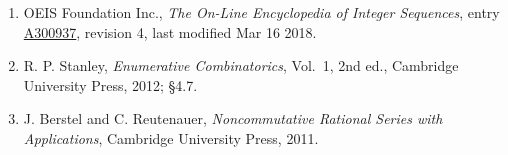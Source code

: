 \documentclass[11pt]{article}
\theoremstyle{definition}
\begin{document}
\begin{enumerate}

\item OEIS Foundation Inc., \emph{The On-Line Encyclopedia of Integer Sequences}, entry \href{https://oeis.org/A300937}{A300937}, revision 4, last modified Mar 16 2018.

\item R. P. Stanley, \emph{Enumerative Combinatorics}, Vol.~1, 2nd ed., Cambridge University Press, 2012; \S4.7.

\item J. Berstel and C. Reutenauer, \emph{Noncommutative Rational Series with Applications}, Cambridge University Press, 2011.

\end{enumerate}
\end{document}
